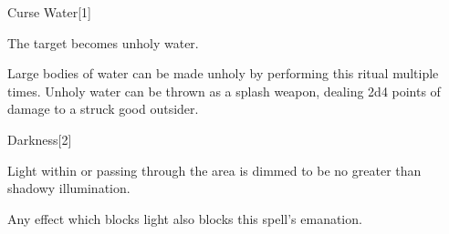 \begin{spellsection}{Curse Water}[1]
    \begin{spellheader}
    \end{spellheader}
    \begin{spellcontent}
        \begin{spelltargetinginfo}
        \end{spelltargetinginfo}
        \begin{spelleffects}

            \spelleffect The target becomes unholy water. 
        \end{spelleffects}
    \end{spellcontent}
    \begin{spellfooter}
        \spellnotes Large bodies of water can be made unholy by performing this ritual multiple times. Unholy water can be thrown as a splash weapon, dealing 2d4 points of damage to a struck good outsider.
    \end{spellfooter}
\end{spellsection}

\begin{spellsection}{Darkness}[2]
    \begin{spellheader}
    \end{spellheader}
    \begin{spellcontent}
        \begin{spelltargetinginfo}
            \spellrng{\rngtouch}
        \end{spelltargetinginfo}
        \begin{spelleffects}

            \spellline
            \spelleffect Light within or passing through the area is dimmed to be no greater than shadowy illumination.
            \spelldur \durlong \dismissable
        \end{spelleffects}
    \end{spellcontent}
    \begin{spellfooter}
        \spellnotes Any effect which blocks light also blocks this spell's emanation.
    \end{spellfooter}
\end{spellsection}

